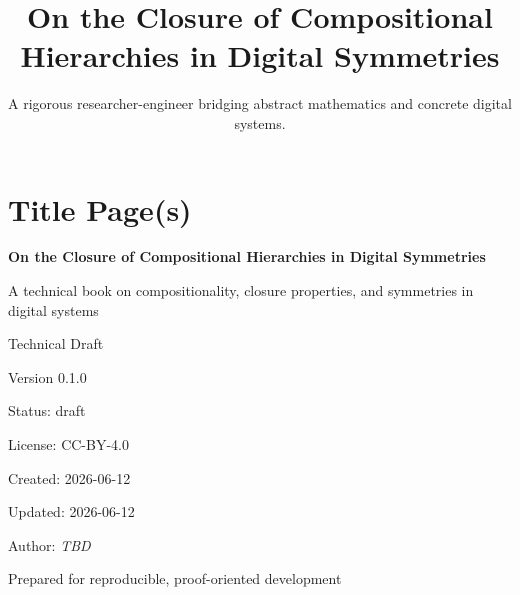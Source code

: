 \documentclass[11pt]{article}
\title{On the Closure of Compositional Hierarchies in Digital Symmetries}
\author{A rigorous researcher-engineer bridging abstract mathematics and concrete digital systems.}
\begin{document}
\maketitle

\tableofcontents

\clearpage

\section{Title Page(s)}

\begin{titlepage}
\centering
\vspace*{1.25in}

{\Huge\bfseries On the Closure of Compositional Hierarchies in Digital Symmetries\par}
\vspace{0.35in}
{\Large A technical book on compositionality, closure properties, and symmetries in digital systems\par}
\vspace{0.85in}

{\large Technical Draft\par}
\vspace{0.25in}
{\large Version 0.1.0\par}
\vspace{0.25in}
{\large Status: draft\par}
\vspace{0.25in}
{\large License: CC-BY-4.0\par}
\vspace{0.25in}
{\large Created: 2026-06-12\par}
\vspace{0.25in}
{\large Updated: 2026-06-12\par}
\vspace{0.25in}
{\large Author: \textit{TBD}\par}

\vfill

{\large Prepared for reproducible, proof-oriented development\par}
\end{titlepage}

\cleardoublepage
\end{document}
